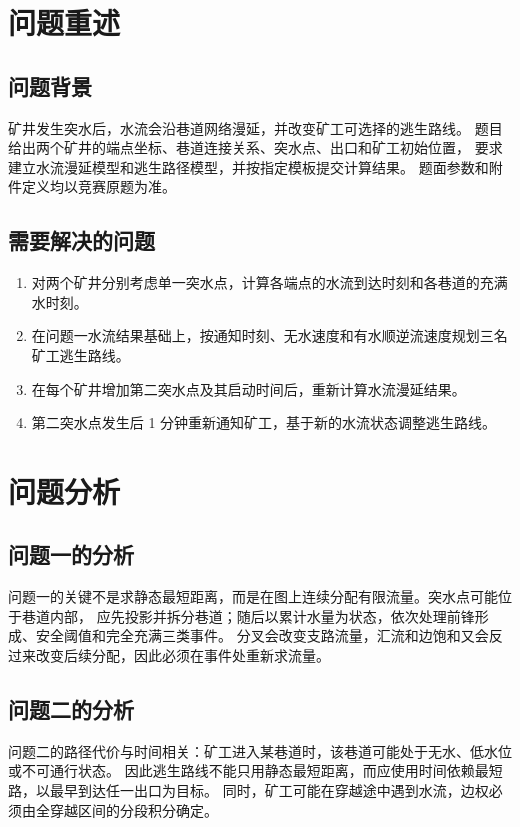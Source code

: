 \section{问题重述}

\subsection{问题背景}
矿井发生突水后，水流会沿巷道网络漫延，并改变矿工可选择的逃生路线。
题目给出两个矿井的端点坐标、巷道连接关系、突水点、出口和矿工初始位置，
要求建立水流漫延模型和逃生路径模型，并按指定模板提交计算结果。
题面参数和附件定义均以竞赛原题为准\cite{cumcm2025d}。

\subsection{需要解决的问题}
\begin{enumerate}[label=问题\arabic*：]
  \item 对两个矿井分别考虑单一突水点，计算各端点的水流到达时刻和各巷道的充满水时刻。
  \item 在问题一水流结果基础上，按通知时刻、无水速度和有水顺逆流速度规划三名矿工逃生路线。
  \item 在每个矿井增加第二突水点及其启动时间后，重新计算水流漫延结果。
  \item 第二突水点发生后 1 分钟重新通知矿工，基于新的水流状态调整逃生路线。
\end{enumerate}

\section{问题分析}

\subsection{问题一的分析}
问题一的关键不是求静态最短距离，而是在图上连续分配有限流量。突水点可能位于巷道内部，
应先投影并拆分巷道；随后以累计水量为状态，依次处理前锋形成、安全阈值和完全充满三类事件。
分叉会改变支路流量，汇流和边饱和又会反过来改变后续分配，因此必须在事件处重新求流量。

\subsection{问题二的分析}
问题二的路径代价与时间相关：矿工进入某巷道时，该巷道可能处于无水、低水位或不可通行状态。
因此逃生路线不能只用静态最短距离，而应使用时间依赖最短路，以最早到达任一出口为目标。
同时，矿工可能在穿越途中遇到水流，边权必须由全穿越区间的分段积分确定。

